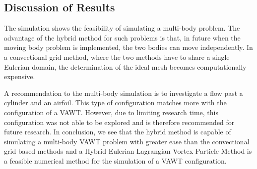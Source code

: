 \subsection{Discussion of Results}

The simulation shows the feasibility of simulating a multi-body problem. The advantage of the hybrid method for such problems is that, in future when the moving body problem is implemented, the two bodies can move independently. In a convectional grid method, where the two methods have to share a single Eulerian domain, the determination of the ideal mesh becomes computationally expensive.

A recommendation to the multi-body simulation is to investigate a flow past a cylinder and an airfoil. This type of configuration matches more with the configuration of a VAWT. However, due to limiting research time, this configuration was not able to be explored and is therefore recommended for future research. In conclusion, we see that the hybrid method is capable of simulating a multi-body VAWT problem with greater ease than the convectional grid based methods and a Hybrid Eulerian Lagrangian Vortex Particle Method is a feasible numerical method for the simulation of a VAWT configuration.







